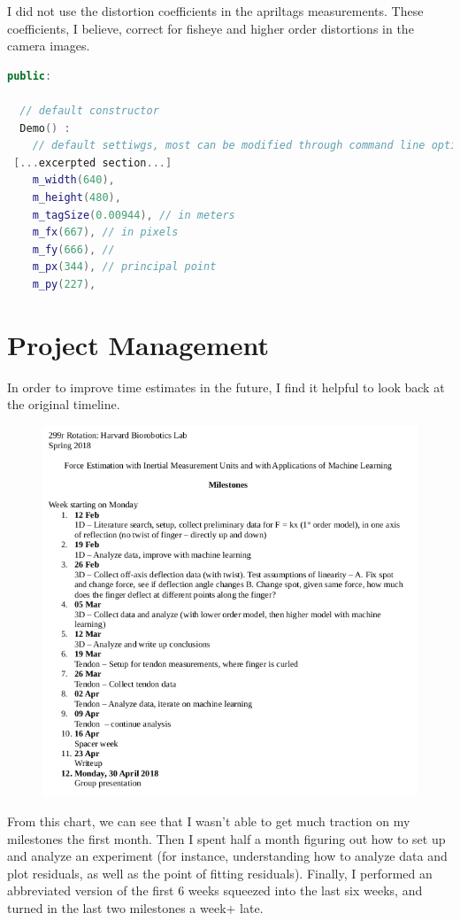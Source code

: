 \documentclass[preprint,12pt,3p]{elsarticle}
\begin{document}
I did not use the distortion coefficients in the apriltags measurements. These
coefficients, I believe, correct for fisheye and higher order distortions in the
camera images.

\begin{lstlisting}[language=C++,breaklines]
public:

  // default constructor
  Demo() :
    // default settiwgs, most can be modified through command line options (see below)
 [...excerpted section...]
    m_width(640),
    m_height(480),
    m_tagSize(0.00944), // in meters
    m_fx(667), // in pixels
    m_fy(666), //
    m_px(344), // principal point
    m_py(227),
\end{lstlisting}


\newpage

\section{Project Management}

In order to improve time estimates in the future, I find it helpful to look back
at the original timeline. 

\begin{figure}[H]
\centering
\includegraphics[width=.9\textwidth]{images/misc/timeline.png}
\end{figure}

From this chart, we can see that I wasn't able to get much traction on my
milestones the first month. Then I spent half a month figuring
out how to set up and analyze an experiment (for instance, understanding how to
analyze data and plot residuals, as well as the point of fitting residuals). Finally, I performed an
abbreviated version of the first 6 weeks squeezed into the last six weeks, and
turned in the last two milestones a week+ late.
\end{document}
